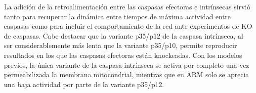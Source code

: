 La adición de la retroalimentación entre las caspasas efectoras e intrínsecas sirvió tanto para recuperar la dinámica entre tiempos de máxima actividad entre caspasas como para incluir el comportamiento de la red ante experimentos de KO de caspasas. Cabe destacar que la variante p35/p12 de la caspasa intrínseca, al ser considerablemente más lenta que la variante p35/p10, permite reproducir resultados en los que las caspasas efectoras están knockeadas. Con los modelos previos, la única variante de la caspasa intrínseca se activa por completo una vez permeabilizada la membrana mitocondrial, mientras que en ARM solo se aprecia una baja actividad por parte de la variante p35/p12.